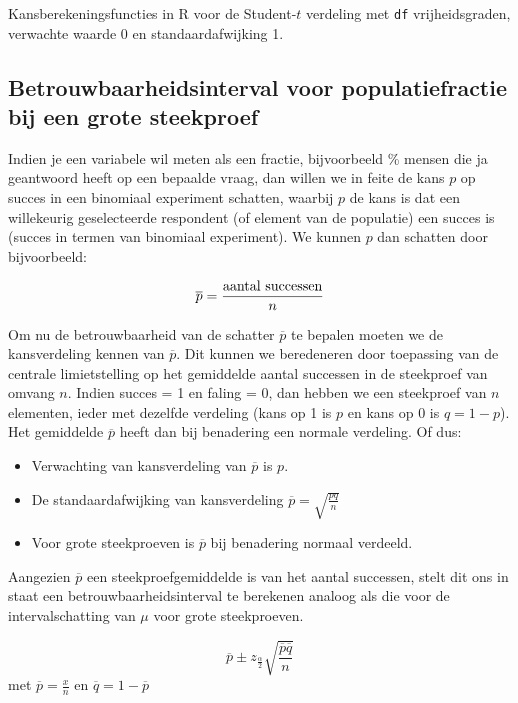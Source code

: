 {\begin{table}
  \caption{Kansberekeningsfuncties in R voor de Student-$t$ verdeling met \texttt{df} vrijheidsgraden, verwachte waarde 0 en standaardafwijking 1.}
  \label{tab:t-prob-r}
\end{table}

\subsection{Betrouwbaarheidsinterval voor populatiefractie bij een grote steekproef}

Indien je een variabele wil meten als een fractie, bijvoorbeeld \% mensen die ja geantwoord heeft op een bepaalde vraag, dan willen we in feite de kans $p$ op succes in een binomiaal experiment schatten, waarbij $p$ de kans is dat een willekeurig geselecteerde respondent (of element van de populatie) een succes is (succes in termen van binomiaal experiment). We kunnen $p$ dan schatten door bijvoorbeeld:

\[ \overline{p} = \frac{\textnormal{aantal successen}}{n} \]

Om nu de betrouwbaarheid van de schatter $\overline{p}$ te bepalen moeten we de kansverdeling kennen van $\overline{p}$. Dit kunnen we beredeneren door toepassing van de centrale limietstelling op het gemiddelde aantal successen in de steekproef van omvang $n$. Indien succes = 1 en faling = 0, dan hebben we een steekproef van $n$ elementen, ieder met dezelfde verdeling (kans op 1 is $p$ en kans op 0 is $q=1-p$).  Het gemiddelde $\overline{p}$ heeft dan bij benadering een normale verdeling. Of dus:

\begin{itemize}
  \item Verwachting van kansverdeling van $\overline{p}$ is $p$.
  \item De standaardafwijking van kansverdeling $\overline{p} = \sqrt{\frac{pq}{n}}$
  \item Voor grote steekproeven is $\overline{p}$ bij benadering normaal verdeeld.
\end{itemize}

Aangezien $\overline{p}$ een steekproefgemiddelde is van het aantal successen, stelt dit ons in staat een betrouwbaarheidsinterval te berekenen analoog als die voor de intervalschatting van $\mu$ voor grote steekproeven.

\begin{definition}
  \[ \overline{p} \pm z_{\frac{\alpha}{2}} \sqrt{\frac{\overline{p}\overline{q}}{n}} \]
  met $\overline{p} = \frac{x}{n}$ en $\overline{q} = 1- \overline{p}$
\end{definition}

}
